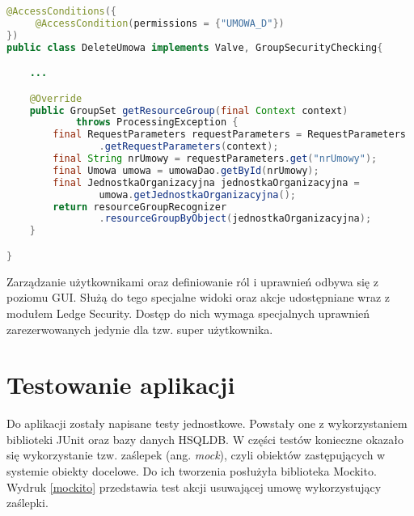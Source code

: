 \begin{lstlisting}[language=Java,style=outcode,showstringspaces=false,caption=Dostęp do akcja usuwającej umowę zabezpieczony za pomocą mechanizmu grup zasobów,label={groupSecurityChecking}]
@AccessConditions({
	 @AccessCondition(permissions = {"UMOWA_D"})
})
public class DeleteUmowa implements Valve, GroupSecurityChecking{

	...

	@Override
	public GroupSet getResourceGroup(final Context context)
			throws ProcessingException {
		final RequestParameters requestParameters = RequestParameters
				.getRequestParameters(context);
		final String nrUmowy = requestParameters.get("nrUmowy");
		final Umowa umowa = umowaDao.getById(nrUmowy);
		final JednostkaOrganizacyjna jednostkaOrganizacyjna =
				umowa.getJednostkaOrganizacyjna();
		return resourceGroupRecognizer
				.resourceGroupByObject(jednostkaOrganizacyjna);
	}

}
\end{lstlisting}

Zarządzanie użytkownikami oraz definiowanie ról i uprawnień odbywa się z poziomu GUI. Służą do tego specjalne widoki oraz akcje udostępniane wraz z modułem Ledge Security. Dostęp do nich wymaga specjalnych uprawnień zarezerwowanych jedynie dla tzw. super użytkownika.

\section[Testowanie aplikacji][Testowanie aplikacji]{Testowanie aplikacji}
Do aplikacji zostały napisane testy jednostkowe. Powstały one z wykorzystaniem biblioteki JUnit oraz bazy danych HSQLDB. W części testów konieczne okazało się wykorzystanie tzw. zaślepek (ang. \textit{mock}), czyli obiektów zastępujących w systemie obiekty docelowe. Do ich tworzenia posłużyła biblioteka Mockito. Wydruk \ref{mockito} przedstawia test akcji usuwającej umowę wykorzystujący zaślepki.

